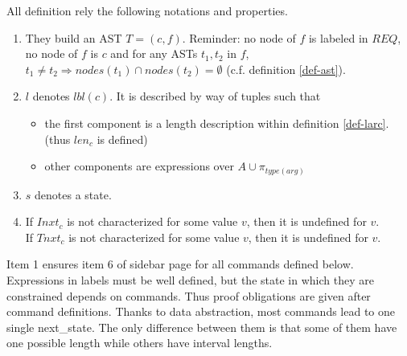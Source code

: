 \documentclass{article}
\begin{document}
\begin{definition}\label{conv}
All definition rely the following nota\-tions and properties. 
\begin{enumerate} 
\item They build an AST $T=(c,f)$. Reminder: no node of $f$ is labeled in $REQ$, no node of $f$ is $c$ and for any ASTs $t_1,t_2$ in $f$, $t_1\neq t_2\Rightarrow nodes(t_1)\cap nodes(t_2)=\emptyset$ (c.f. definition \ref{def-ast}).
\item $l$ denotes $lbl(c)$. It is described by way of tuples such that
      \begin{itemize}
			\item the first component is a length description within definition \ref{def-larc}. (thus $len_c$ is defined)
			\item other components are expressions over $A\cup \pi_{type(arg)}$
			\end{itemize}
\item $s$ denotes a state.
\item If $Inxt_c$ is not characterized for some value $v$, then it is undefined for $v$.\\ If $T\!nxt_c$ is not characterized for some value $v$, then it is undefined for $v$.
\end{enumerate}
\end{definition}
Item 1 ensures item 6 of sidebar page \pageref{safestates} for all commands defined below. Expressions in labels must be well defined, but the state in which they are constrained depends on commands. Thus proof obligations are given after command definitions.
Thanks to data abstraction, most commands lead to one single next\_state. The only difference between them is that some of them have one possible length while others have interval lengths.
\end{document}
